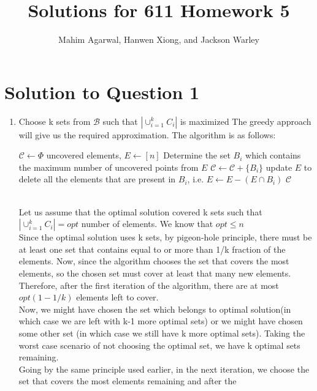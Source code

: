 \documentclass[11pt]{article}
\title{Solutions for 611 Homework 5}
\author{Mahim Agarwal, Hanwen Xiong, and Jackson Warley}
\begin{document}
\maketitle

\section{Solution to Question 1}

\begin{enumerate}
    \item Choose k sets from $\mathcal{B}$ such that $|{\cup_{i=1}^k C_i}|$ is maximized \newline
    The greedy approach will give us the required approximation. The algorithm is as follows:
    \begin{algorithm}
  \begin{algorithmic}
      \State $\mathcal{C} \leftarrow \Phi$
      \State uncovered elements, $E \leftarrow [n]$
          \State Determine the set $B_i$ which contains the maximum number of uncovered points from $E$
          \State $\mathcal{C} \leftarrow \mathcal{C} + \{B_i\}$
          \State update $E$ to delete all the elements that are present in $B_i$, i.e. $E \leftarrow E - (E \cap B_i)$
      \EndWhile
      \State \Return $\mathcal{C}$
    \EndFunction
  \end{algorithmic}
\end{algorithm}\\
Let us assume that the optimal solution covered k sets such that $|{\cup_{i=1}^k C_i}| = opt $ number of elements. We know that $opt \leq n$ \\
Since the optimal solution uses k sets, by pigeon-hole principle, there must be at least one set that contains equal to or more than 1/k 
fraction of the elements. Now, since the algorithm chooses the set that covers the most elements, so the chosen set must cover at least 
that many new elements. Therefore, after the first iteration of the algorithm, there are at most $opt(1 - 1/k)$ elements left to cover. \\
Now, we might have chosen the set which belongs to optimal solution(in which case we are left with k-1 more optimal sets) or we might 
have chosen some other set (in which case we still have k more optimal sets). Taking the worst case scenario of not choosing the optimal 
set, we have k optimal sets remaining.\\
Going by the same principle used earlier, in the next iteration, we choose the set that covers the most elements remaining and after the 

\end{enumerate}
\end{document}

